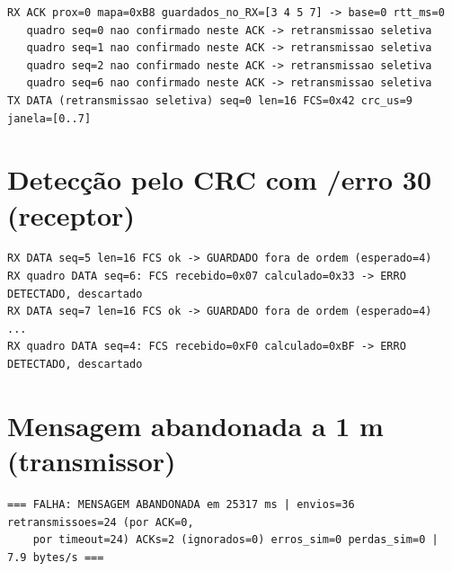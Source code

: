 \documentclass[12pt, oneside, a4paper, sumario=tradicional, chapter=TITLE, brazilian]{abntex2}
\begin{document}
\begin{apendicesenv}
\begin{Verbatim}[fontsize=\scriptsize,frame=single,framesep=2mm,rulecolor=\color{gray!60},breaklines,breakanywhere]
RX ACK prox=0 mapa=0xB8 guardados_no_RX=[3 4 5 7] -> base=0 rtt_ms=0
   quadro seq=0 nao confirmado neste ACK -> retransmissao seletiva
   quadro seq=1 nao confirmado neste ACK -> retransmissao seletiva
   quadro seq=2 nao confirmado neste ACK -> retransmissao seletiva
   quadro seq=6 nao confirmado neste ACK -> retransmissao seletiva
TX DATA (retransmissao seletiva) seq=0 len=16 FCS=0x42 crc_us=9 janela=[0..7]
\end{Verbatim}

\section{Detecção pelo CRC com /erro 30 (receptor)}

\begin{Verbatim}[fontsize=\scriptsize,frame=single,framesep=2mm,rulecolor=\color{gray!60},breaklines,breakanywhere]
RX DATA seq=5 len=16 FCS ok -> GUARDADO fora de ordem (esperado=4)
RX quadro DATA seq=6: FCS recebido=0x07 calculado=0x33 -> ERRO DETECTADO, descartado
RX DATA seq=7 len=16 FCS ok -> GUARDADO fora de ordem (esperado=4)
...
RX quadro DATA seq=4: FCS recebido=0xF0 calculado=0xBF -> ERRO DETECTADO, descartado
\end{Verbatim}

\section{Mensagem abandonada a 1 m (transmissor)}

\begin{Verbatim}[fontsize=\scriptsize,frame=single,framesep=2mm,rulecolor=\color{gray!60},breaklines,breakanywhere]
=== FALHA: MENSAGEM ABANDONADA em 25317 ms | envios=36 retransmissoes=24 (por ACK=0,
    por timeout=24) ACKs=2 (ignorados=0) erros_sim=0 perdas_sim=0 | 7.9 bytes/s ===
\end{Verbatim}

\end{apendicesenv}
\end{document}
